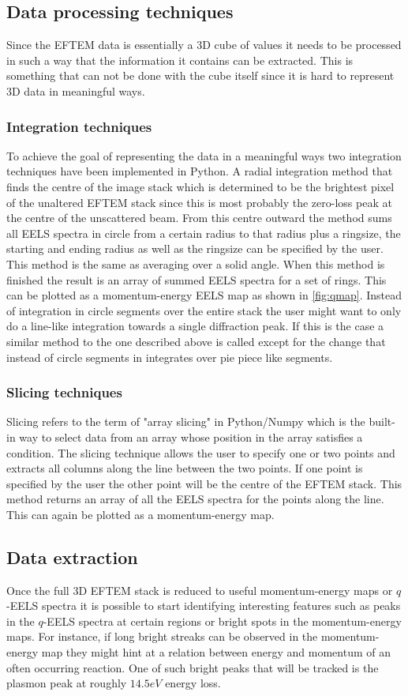 \subsection{Data processing techniques}
Since the EFTEM data is essentially a 3D cube of values it needs to be processed in such a way that the information it contains can be extracted. This is something that can not be done with the cube itself since it is hard to represent 3D data in meaningful ways.

\subsubsection{Integration techniques}
To achieve the goal of representing the data in a meaningful ways two integration techniques have been implemented in Python.
A radial integration method that finds the centre of the image stack which is determined to be the brightest pixel of the unaltered EFTEM stack since this is most probably the zero-loss peak at the centre of the unscattered beam.
From this centre outward the method sums all EELS spectra in circle from a certain radius to that radius plus a ringsize, the starting and ending radius as well as the ringsize can be specified by the user.
This method is the same as averaging over a solid angle.
When this method is finished the result is an array of summed EELS spectra for a set of rings. This can be plotted as a momentum-energy EELS map as shown in \ref{fig:qmap}.
Instead of integration in circle segments over the entire stack the user might want to only do a line-like integration towards a single diffraction peak. If this is the case a similar method to the one described above is called except for the change that instead of circle segments in integrates over pie piece like segments.


\subsubsection{Slicing techniques}
Slicing refers to the term of "array slicing" in Python/Numpy which is the built-in way to select data from an array whose position in the array satisfies a condition. The slicing technique allows the user to specify one or two points and extracts all columns along the line between the two points. If one point is specified by the user the other point will be the centre of the EFTEM stack. This method returns an array of all the EELS spectra for the points along the line. This can again be plotted as a momentum-energy map.

\subsection{Data extraction}
Once the full 3D EFTEM stack is reduced to useful momentum-energy maps or $q$-EELS spectra it is possible to start identifying interesting features such as peaks in the $q$-EELS spectra at certain regions or bright spots in the momentum-energy maps. For instance, if long bright streaks can be observed in the momentum-energy map they might hint at a relation between energy and momentum of an often occurring reaction. One of such bright peaks that will be tracked is the plasmon peak at roughly $14.5eV$ energy loss.

